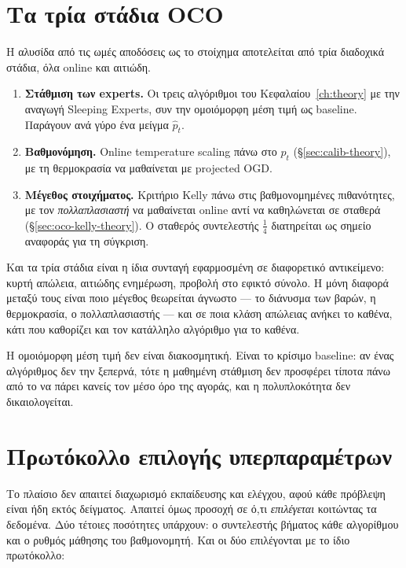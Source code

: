 \documentclass[12pt,a4paper,oneside]{report}
\renewcommand{\_}{\oldunderscore\allowbreak}
\theoremstyle{definition}
\theoremstyle{plain}
\theoremstyle{remark}
\begin{document}
\section{Τα τρία στάδια OCO}

Η αλυσίδα από τις ωμές αποδόσεις ως το στοίχημα αποτελείται από τρία διαδοχικά στάδια, όλα
online και αιτιώδη.

\begin{enumerate}
  \item \textbf{Στάθμιση των experts.} Οι τρεις αλγόριθμοι του Κεφαλαίου~\ref{ch:theory} με
        την αναγωγή Sleeping Experts, συν την ομοιόμορφη μέση τιμή ως baseline. Παράγουν
        ανά γύρο ένα μείγμα $\hat{p}_t$.
  \item \textbf{Βαθμονόμηση.} Online temperature scaling πάνω στο $\hat{p}_t$
        (\S\ref{sec:calib-theory}), με τη θερμοκρασία να μαθαίνεται με projected OGD.
  \item \textbf{Μέγεθος στοιχήματος.} Κριτήριο Kelly πάνω στις βαθμονομημένες πιθανότητες,
        με τον \emph{πολλαπλασιαστή} να μαθαίνεται online αντί να καθηλώνεται σε σταθερά
        (\S\ref{sec:oco-kelly-theory}). Ο σταθερός συντελεστής $\tfrac14$ διατηρείται ως
        σημείο αναφοράς για τη σύγκριση.
\end{enumerate}

Και τα τρία στάδια είναι η ίδια συνταγή εφαρμοσμένη σε διαφορετικό αντικείμενο: κυρτή
απώλεια, αιτιώδης ενημέρωση, προβολή στο εφικτό σύνολο. Η μόνη διαφορά μεταξύ τους είναι
ποιο μέγεθος θεωρείται άγνωστο --- το διάνυσμα των βαρών, η θερμοκρασία, ο πολλαπλασιαστής
--- και σε ποια κλάση απώλειας ανήκει το καθένα, κάτι που καθορίζει και τον κατάλληλο
αλγόριθμο για το καθένα.

Η ομοιόμορφη μέση τιμή δεν είναι διακοσμητική. Είναι το κρίσιμο baseline: αν ένας αλγόριθμος
δεν την ξεπερνά, τότε η μαθημένη στάθμιση δεν προσφέρει τίποτα πάνω από το να πάρει κανείς
τον μέσο όρο της αγοράς, και η πολυπλοκότητα δεν δικαιολογείται.

\section{Πρωτόκολλο επιλογής υπερπαραμέτρων}
\label{sec:protocol}

Το πλαίσιο δεν απαιτεί διαχωρισμό εκπαίδευσης και ελέγχου, αφού κάθε πρόβλεψη είναι ήδη
εκτός δείγματος. Απαιτεί όμως προσοχή σε ό,τι \emph{επιλέγεται} κοιτώντας τα δεδομένα. Δύο
τέτοιες ποσότητες υπάρχουν: ο συντελεστής βήματος κάθε αλγορίθμου και ο ρυθμός μάθησης του
βαθμονομητή. Και οι δύο επιλέγονται με το ίδιο πρωτόκολλο:
\end{document}
